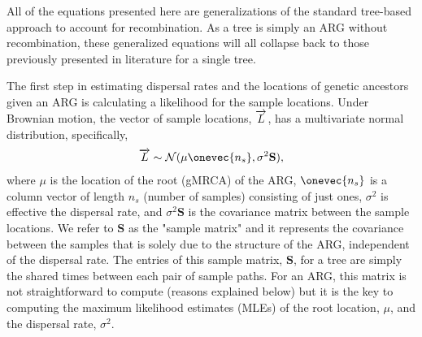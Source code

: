 


All of the equations presented here are generalizations of the standard tree-based approach to account for recombination. As a tree is simply an ARG without recombination, these generalized equations will all collapse back to those previously presented in literature for a single tree.

The first step in estimating dispersal rates and the locations of genetic ancestors given an ARG is calculating a likelihood for the sample locations. Under Brownian motion, the vector of sample locations, $\overrightarrow{L}$, has a multivariate normal distribution, specifically,
%
\begin{eqnarray}\label{eqn:Lvec}
    \Lvec \sim \cN(\mu \onevec{{n_s}},\sigma^2 \mathbf{S} ),
\end{eqnarray}
%
where $\mu$ is the location of the root (gMRCA) of the ARG, $\onevec{{n_s}}$ is a column vector of length $n_s$ (number of samples) consisting of just ones, $\sigma^2$ is effective the dispersal rate, and $\sigma^2 \mathbf{S}$ is the covariance matrix between the sample locations. We refer to $\mathbf{S}$ as the "sample matrix" and it represents the covariance between the samples that is solely due to the structure of the ARG, independent of the dispersal rate. The entries of this sample matrix, $\mathbf{S}$, for a tree are simply the shared times between each pair of sample paths. For an ARG, this matrix is not straightforward to compute (reasons explained below) but it is the key to computing the maximum likelihood estimates (MLEs) of the root location, $\mu$, and the dispersal rate, $\sigma^2$.

